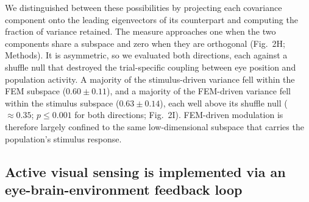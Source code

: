 \documentclass{lite}
\begin{document}
We distinguished between these possibilities by projecting each covariance component onto the leading eigenvectors of its counterpart and computing the fraction of variance retained. The measure approaches one when the two components share a subspace and zero when they are orthogonal (Fig.~2H; Methods). It is asymmetric, so we evaluated both directions, each against a shuffle null that destroyed the trial-specific coupling between eye position and population activity. A majority of the stimulus-driven variance fell within the FEM subspace ($0.60 \pm 0.11$), and a majority of the FEM-driven variance fell within the stimulus subspace ($0.63 \pm 0.14$), each well above its shuffle null ($\approx 0.35$; $p \leq 0.001$ for both directions; Fig.~2I). FEM-driven modulation is therefore largely confined to the same low-dimensional subspace that carries the population's stimulus response.



\subsection{Active visual sensing is implemented via an eye-brain-environment feedback loop}
\end{document}
